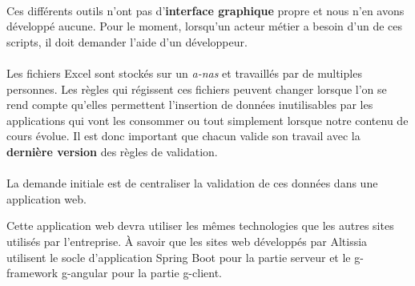 \paragraph{}
Ces différents outils n'ont pas d'\textbf{interface graphique} propre et nous n'en avons développé aucune.
Pour le moment, lorsqu'un acteur métier a besoin d'un de ces scripts, il doit demander l'aide d'un développeur.

\paragraph{}
Les fichiers Excel sont stockés sur un \textit{\gls{a-nas}} et travaillés par de multiples personnes.
Les règles qui régissent ces fichiers peuvent changer lorsque l'on se rend compte qu'elles permettent l'insertion de données inutilisables par les applications qui vont les consommer ou tout simplement lorsque notre contenu de cours évolue.
Il est donc important que chacun valide son travail avec la \textbf{dernière version} des règles de validation.

\paragraph{}
La demande initiale est de centraliser la validation de ces données dans une application web.

Cette application web devra utiliser les mêmes technologies que les autres sites utilisés par l'entreprise. À savoir que les sites web développés par Altissia utilisent le socle d'application Spring Boot pour la partie serveur et le \gls{g-framework} \Gls{g-angular} pour la partie \gls{g-client}.
